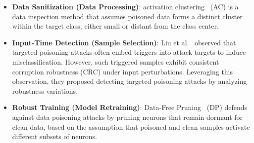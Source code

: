 \documentclass[lettersize,journal]{IEEEtran}
\newcommand{\pandora}{{\scshape Pandora}\xspace}
\begin{document}
\begin{itemize}[leftmargin=0.35cm]
	\item \textbf{Data Sanitization (Data Processing)}: activation clustering~\cite{chen2018detecting} (AC) is a data inspection method that assumes poisoned data forms a distinct cluster within the target class, either small or distant from the class center.
	
	\item \textbf{Input-Time Detection (Sample Selection)}: Liu et al.~\cite{2023-ICCV-Trigger-Detect} observed that targeted poisoning attacks often embed triggers into attack targets to induce misclassification.
	However, such triggered samples exhibit consistent corruption robustness (CRC) under input perturbations. Leveraging this observation, they proposed detecting targeted poisoning attacks by analyzing robustness variations.
	
	\item \textbf{Robust Training (Model Retraining)}: Data-Free Pruning~\cite{DFP} (DP) defends against data poisoning attacks by pruning neurons that remain dormant for clean data, based on the assumption that poisoned and clean samples activate different subsets of neurons.
	
	
\end{itemize}
\end{document}
